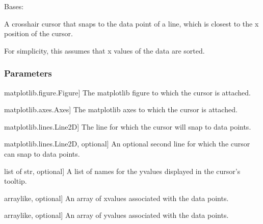 \documentclass[letterpaper,10pt,english]{sphinxmanual}
\begin{document}
\begin{fulllineitems}
\label{\detokenize{pycatch/utils/plot:pycatch.utils.plot.SnappingCursor}}
\pysigstartsignatures
{}
\pysigstopsignatures
\sphinxAtStartPar
Bases: 

\sphinxAtStartPar
A cross\sphinxhyphen{}hair cursor that snaps to the data point of a line, which is
closest to the x position of the cursor.

\sphinxAtStartPar
For simplicity, this assumes that x values of the data are sorted.


\subsubsection{Parameters}
\label{\detokenize{pycatch/utils/plot:parameters}}\begin{description}
\sphinxlineitem{fig}{[}matplotlib.figure.Figure{]}
\sphinxAtStartPar
The matplotlib figure to which the cursor is attached.

\sphinxlineitem{ax}{[}matplotlib.axes.Axes{]}
\sphinxAtStartPar
The matplotlib axes to which the cursor is attached.

\sphinxlineitem{line}{[}matplotlib.lines.Line2D{]}
\sphinxAtStartPar
The line for which the cursor will snap to data points.

\sphinxlineitem{line2}{[}matplotlib.lines.Line2D, optional{]}
\sphinxAtStartPar
An optional second line for which the cursor can snap to data points.

\sphinxlineitem{names}{[}list of str, optional{]}
\sphinxAtStartPar
A list of names for the y\sphinxhyphen{}values displayed in the cursor’s tooltip.

\sphinxlineitem{xe}{[}array\sphinxhyphen{}like, optional{]}
\sphinxAtStartPar
An array of x\sphinxhyphen{}values associated with the data points.

\sphinxlineitem{ye}{[}array\sphinxhyphen{}like, optional{]}
\sphinxAtStartPar
An array of y\sphinxhyphen{}values associated with the data points.


\end{description}
\end{fulllineitems}
\end{document}
